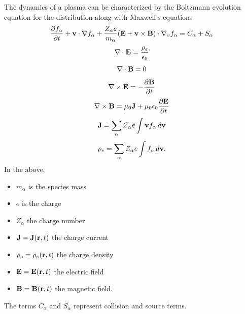 \documentclass[a4paper,11pt]{report}
\begin{document}
The dynamics of a plasma can be characterized by the Boltzmann evolution equation for the distribution along with Maxwell's equations
\begin{equation}
\label{eq:kinetic_equation}
\frac{\partial f_\alpha}{\partial t} + \mathbf{v} \cdot \nabla f_\alpha + \frac{Z_\alpha e}{m_\alpha} ( \mathbf{E} + \mathbf{v} \times \mathbf{B} ) \cdot \nabla_v f_\alpha = C_\alpha + S_\alpha
\end{equation}
\begin{equation}
\label{eq:maxwell_3}
\nabla \cdot \mathbf{E} = \frac{\rho_e}{\epsilon_0} 
\end{equation}
\begin{equation}
\label{eq:maxwell_4}
\nabla \cdot \mathbf{B} = 0
\end{equation}
\begin{equation}
\label{eq:maxwell_1}
\nabla \times \mathbf{E} = -\frac{ \partial \mathbf{B}}{\partial t}
\end{equation}
\begin{equation}
\label{eq:maxwell_2}
\nabla \times \mathbf{B} = \mu_0 \mathbf{J} + \mu_0 \epsilon_0 \frac{\partial \mathbf{E}}{\partial t}
\end{equation}
\begin{equation}
\mathbf{J} = \sum_\alpha Z_\alpha e \int \mathbf{v} f_\alpha \, d\mathbf{v}
\end{equation}
\begin{equation}
\rho_e = \sum_\alpha Z_\alpha e \int f_\alpha \, d\mathbf{v}.
\end{equation}
In the above, 
\begin{itemize}
\item $m_\alpha$ is the species mass
\item $e$ is the charge
\item $Z_\alpha$ the charge number
\item $\mathbf{J} = \mathbf{J}(\mathbf{r},t)$ the charge current
\item $\rho_e = \rho_e(\mathbf{r},t)$ the charge density
\item $\mathbf{E} = \mathbf{E}(\mathbf{r},t)$ the electric field
\item $\mathbf{B} = \mathbf{B}(\mathbf{r},t)$ the magnetic field.
\end{itemize}
The terms $C_\alpha$ and $S_\alpha$ represent collision and source terms.
\end{document}
